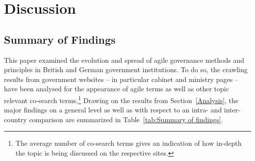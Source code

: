 \section{Discussion}
\subsection{Summary of Findings}
This paper examined the evolution and spread of agile governance methods and principles in British and German government institutions. To do so, the crawling results from government websites – in particular cabinet and ministry pages – have been analysed for the appearance of agile terms as well as other topic relevant co-search terms.\footnote{The average number of co-search terms gives an indication of how in-depth the topic is being discussed on the respective sites.} Drawing on the results from Section~\ref{Analysis}, the major findings on a general level as well as with respect to an intra- and inter-country comparison are summarized in Table~\ref{tab:Summary of findings}.

